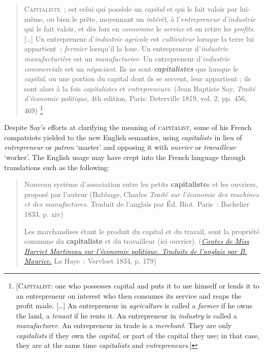 \documentclass[output=paper]{langsci/langscibook}
\begin{document}
\begin{quote}
\textsc{Capitaliste}~; est celui qui possède un \emph{capital} et qui le
fait valoir par lui-même, ou bien le prête, moyennant un \emph{intérêt},
à l'\emph{entrepreneur d'industrie} qui le fait valoir, et dès lors en
\emph{consomme} le \emph{service} et en retire les \emph{profits}.
{[}\ldots{}{]} Un entrepreneur d'\emph{industrie agricole} est
\emph{cultivateur} lorsque la terre lui appartient~; \emph{fermier}
lorsqu'il la loue. Un entrepreneur d'\emph{industrie manufacturière} est
un \emph{manufacturier}. Un entrepreneur d'\emph{industrie commerciale}
est un \emph{négociant}. Ils ne sont \emph{\textbf{capitalistes}} que
lorsque le \emph{capital}, ou une portion du capital dont ils se
servent, leur appartient ; ils sont alors à la fois \emph{capitalistes}
et \emph{entrepreneurs}.
  (Jean Baptiste Say, \emph{Traité d'économie
politique}, 4th edition, Paris: Deterville 1819, vol. 2, pp. 456, 469)%
\footnote{{[}\textsc{Capitalist}: one who
  possesses capital and puts it to use himself or lends it to an
  entrepreneur on interest who then consumes its service and reaps the
  profit made. {[}\ldots{}{]} An entrepreneur in \emph{agriculture} is
  called a \emph{farmer} if he owns the land, a \emph{tenant} if he
  rents it. An entrepreneur in \emph{industry} is called a
  \emph{manufacturer}. An entrepreneur in trade is a \emph{merchant}.
  They are only \emph{capitalists} if they own the \emph{capital}, or
  part of the capital they use; in that case, they are at the same time
  \emph{capitalists} and \emph{entrepreneurs}.{]}}
\end{quote}

Despite Say's efforts at clarifying the meaning of \textsc{capitalist},
some of his French compatriots yielded to the new English semantics,
using \emph{capitaliste} in lieu of \emph{entrepreneur} or \emph{patron}
`master' and opposing it with \emph{ouvrier} or \emph{travailleur}
`worker'. The English usage may have crept into the French language
through translations such as the following:

\begin{quote}
Nouveau système d'association entre les petits \textbf{capitaliste}s et
les ouvriers, proposé par l'auteur (Babbage, Charles \emph{Traité sur
l'économie des machines et des manufactures.} Traduit de l'anglais par
Éd. Biot. Paris~: Bachelier 1833, p. xiv)

Les marchandises étant le produit du capital et du travail, sont la
propriété commune du \textbf{capitaliste} et du travailleur (ici
ouvrier).
(\href{https://books.google.at/books?id=o55UAAAAcAAJ\&pg=PA179\&dq=\%
22capitaliste\%22\&hl=de\&sa=X\&ved=0ahUKEwj7haSz_ZXOAhUG7BQKHTW2D7k4FBDoAQgjMAE
}{\emph{Contes
de Miss Harriet Martineau sur l'économie politique. Traduits de
l'anglais par B. Maurice.}} La Haye~: Vervloet 1834, p. 179)
\end{quote}
\end{document}
